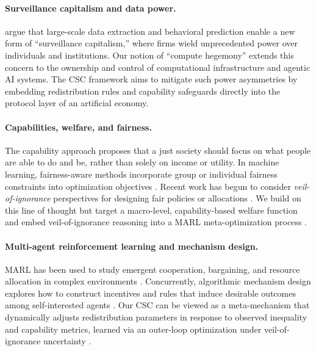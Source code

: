 \documentclass{article}
\begin{document}
\paragraph{Surveillance capitalism and data power.}
\cite{zuboff2019age} argue that large-scale data extraction and behavioral prediction enable a new form of ``surveillance capitalism,'' where firms wield unprecedented power over individuals and institutions. Our notion of ``compute hegemony'' extends this concern to the ownership and control of computational infrastructure and agentic AI systems. The CSC framework aims to mitigate such power asymmetries by embedding redistribution rules and capability safeguards directly into the protocol layer of an artificial economy.

\paragraph{Capabilities, welfare, and fairness.}
The capability approach \cite{sen1985commodities,nussbaum2011creating} proposes that a just society should focus on what people are able to do and be, rather than solely on income or utility. In machine learning, fairness-aware methods incorporate group or individual fairness constraints into optimization objectives \cite{dwork2012fairness,barocas2019fairness}. Recent work has begun to consider \emph{veil-of-ignorance} perspectives for designing fair policies or allocations \cite{harsanyi1975can,binns2018fairness,mullainathan2024algorithms}. We build on this line of thought but target a macro-level, capability-based welfare function and embed veil-of-ignorance reasoning into a MARL meta-optimization process \cite{koster2024human,xu2025reinforcement}.

\paragraph{Multi-agent reinforcement learning and mechanism design.}
MARL has been used to study emergent cooperation, bargaining, and resource allocation in complex environments \cite{leibo2017multi,perolat2017multi,zhang2023social}. Concurrently, algorithmic mechanism design explores how to construct incentives and rules that induce desirable outcomes among self-interested agents \cite{nisan2007algorithmic,parkes2015economics}. Our CSC can be viewed as a meta-mechanism that dynamically adjusts redistribution parameters in response to observed inequality and capability metrics, learned via an outer-loop optimization under veil-of-ignorance uncertainty \cite{rahwan2019machine,yang2026scalable}.
\end{document}
